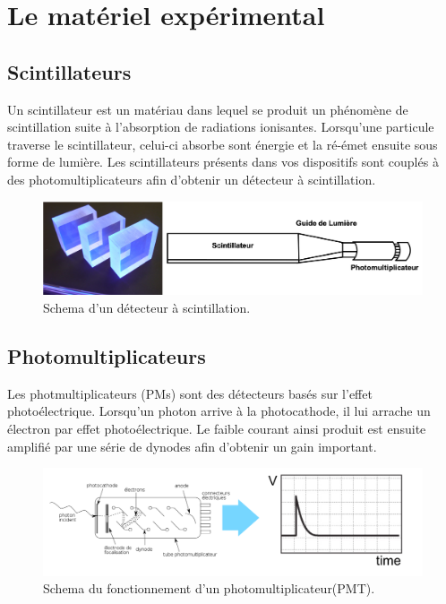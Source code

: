 \section{Le matériel expérimental}

\subsection{Scintillateurs}

Un scintillateur est un matériau dans lequel se produit un phénomène de scintillation suite à l'absorption de radiations ionisantes. Lorsqu'une particule traverse le scintillateur, celui-ci absorbe sont énergie et la ré-émet ensuite sous forme de lumière. Les scintillateurs présents dans vos dispositifs sont couplés à des photomultiplicateurs afin d'obtenir un détecteur à scintillation. \\

\begin{figure}[!h]
    \centering
	\includegraphics[width=\textwidth]{figures/Scintillateur.png}
    \caption{Schema d'un détecteur à scintillation.}
    \label{fig:PMT_readout} 
\end{figure}

\subsection{Photomultiplicateurs}

Les photmultiplicateurs (PMs) sont des détecteurs basés sur l'effet photoélectrique. Lorsqu'un photon arrive à la photocathode, il lui arrache un électron par effet photoélectrique. Le faible courant ainsi produit est ensuite amplifié par une série de dynodes afin d'obtenir un gain important. \\

\begin{figure}[!h]
    \centering
	\includegraphics[width=\textwidth]{figures/PMT_readout.png}
    \caption{Schema du fonctionnement d'un photomultiplicateur(PMT).}
    \label{fig:PMT_readout} 
\end{figure}

